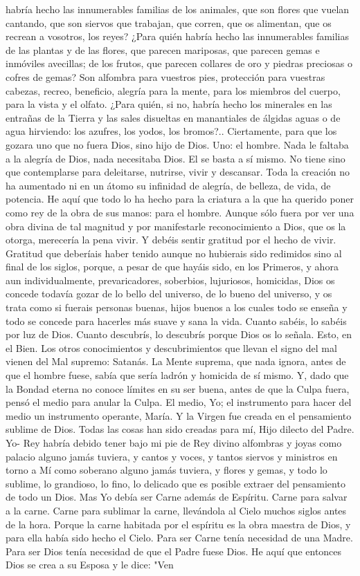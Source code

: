 \documentclass[12pt]{book} %
\begin{document}
habría hecho las innumerables familias de los animales, que son flores que vuelan cantando, que son siervos que trabajan, que corren, que os alimentan, que os recrean a vosotros, los reyes? ¿Para quién habría hecho las innumerables familias de las plantas y de las flores, que parecen mariposas, que parecen gemas e inmóviles avecillas; de los frutos, que parecen collares de oro y piedras preciosas o cofres de gemas? Son alfombra para vuestros pies, protección para vuestras cabezas, recreo, beneficio, alegría para la mente, para los miembros del cuerpo, para la vista y el olfato. ¿Para quién, si no, habría hecho los minerales en las entrañas de la Tierra y las sales disueltas en manantiales de álgidas aguas o de agua hirviendo: los azufres, los yodos, los bromos?.. Ciertamente, para que los gozara uno que no fuera Dios, sino hijo de Dios. Uno: el hombre. Nada le faltaba a la alegría de Dios, nada necesitaba Dios. El se basta a sí mismo. No tiene sino que contemplarse para deleitarse, nutrirse, vivir y descansar. Toda la creación no ha aumentado ni en un átomo su infinidad de alegría, de belleza, de vida, de potencia. He aquí que todo lo ha hecho para la criatura a la que ha querido poner como rey de la obra de sus manos: para el hombre. Aunque sólo fuera por ver una obra divina de tal magnitud y por manifestarle reconocimiento a Dios, que os la otorga, merecería la pena vivir. Y debéis sentir gratitud por el hecho de vivir. Gratitud que deberíais haber tenido aunque no hubierais sido redimidos sino al final de los siglos, porque, a pesar de que hayáis sido, en los Primeros, y ahora aun individualmente, prevaricadores, soberbios, lujuriosos, homicidas, Dios os concede todavía gozar de lo bello del universo, de lo bueno del universo, y os trata como si fuerais personas buenas, hijos buenos a los cuales todo se enseña y todo se concede para hacerles más suave y sana la vida. Cuanto sabéis, lo sabéis por luz de Dios. Cuanto descubrís, lo descubrís porque Dios os lo señala. Esto, en el Bien. Los otros conocimientos y descubrimientos que llevan el signo del mal vienen del Mal supremo: Satanás. La Mente suprema, que nada ignora, antes de que el hombre fuese, sabía que sería ladrón y homicida de sí mismo. Y, dado que la Bondad eterna no conoce límites en su ser buena, antes de que la Culpa fuera, pensó el medio para anular la Culpa. El medio, Yo; el instrumento para hacer del medio un instrumento operante, María. Y la Virgen fue creada en el pensamiento sublime de Dios. Todas las cosas han sido creadas para mí, Hijo dilecto del Padre. Yo- Rey habría debido tener bajo mi pie de Rey divino alfombras y joyas como palacio alguno jamás tuviera, y cantos y voces, y tantos siervos y ministros en torno a Mí como soberano alguno jamás tuviera, y flores y gemas, y todo lo sublime, lo grandioso, lo fino, lo delicado que es posible extraer del pensamiento de todo un Dios. Mas Yo debía ser Carne además de Espíritu. Carne para salvar a la carne. Carne para sublimar la carne, llevándola al Cielo muchos siglos antes de la hora. Porque la carne habitada por el espíritu es la obra maestra de Dios, y para ella había sido hecho el Cielo. Para ser Carne tenía necesidad de una Madre. Para ser Dios tenía necesidad de que el Padre fuese Dios. He aquí que entonces Dios se crea a su Esposa y le dice: "Ven 
\end{document}
